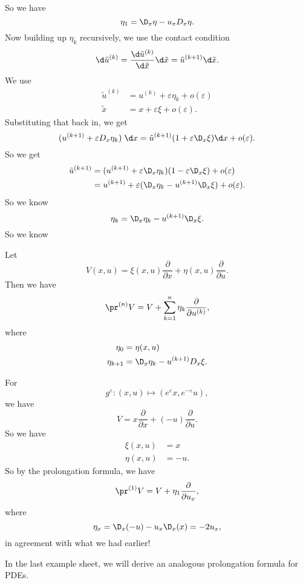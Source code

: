\documentclass[a4paper]{article}
\begin{document}
So we have
\[
  \eta_1 = \D_x \eta - u_x D_x \eta.
\]
Now building up $\eta_k$ recursively, we use the contact condition
\[
  \d \tilde{u}^{(k)} = \frac{\d \tilde{u}^{(k)}}{\d \tilde{x}}\d \tilde{x} = \tilde{u}^{(k + 1)} \d \tilde{x}.
\]
We use
\begin{align*}
  \tilde{u}^{(k)} &= u^{(k)} + \varepsilon \eta_k + o(\varepsilon)\\
  \tilde{x} &= x + \varepsilon \xi + o(\varepsilon).
\end{align*}
Substituting that back in, we get
\[
  (u^{(k + 1)} + \varepsilon D_x \eta_k) \;\d x = \tilde{u}^{(k + 1)} (1 + \varepsilon \D_x \xi) \d x + o(\varepsilon).
\]
So we get
\begin{align*}
  \tilde{u}^{(k + 1)} &= (u^{(k + 1)} + \varepsilon \D_x \eta_k) (1 - \varepsilon \D_x \xi) + o(\varepsilon)\\
  &= u^{(k + 1)} + \varepsilon(\D_x \eta_k - u^{(k + 1)} \D_x \xi) + o(\varepsilon).
\end{align*}
So we know
\[
  \eta_k = \D_x \eta_k - u^{(k + 1)} \D_x \xi.
\]
So we know
\begin{prop}
  Let
  \[
    V(x, u) = \xi(x, u) \frac{\partial}{\partial x} + \eta(x, u) \frac{\partial}{\partial u}.
  \]
  Then we have
  \[
    \pr^{(n)}V = V + \sum_{k = 1}^n \eta_k\frac{\partial}{\partial u^{(k)}},
  \]
  where
  \begin{align*}
    \eta_0 &= \eta(x, u)\\
    \eta_{k + 1} &= \D_x \eta_k - u^{(k + 1)} D_x \xi.
  \end{align*}
\end{prop}

\begin{eg}
  For
  \[
    g^\varepsilon: (x, u) \mapsto (e^\varepsilon x, e^{-\varepsilon}u),
  \]
  we have
  \[
    V = x \frac{\partial}{\partial x} + (-u) \frac{\partial}{\partial u}.
  \]
  So we have
  \begin{align*}
    \xi(x, u) &= x\\
    \eta(x, u) &= -u.
  \end{align*}
  So by the prolongation formula, we have
  \[
    \pr^{(1)}V = V + \eta_1 \frac{\partial}{\partial u_x},
  \]
  where
  \[
    \eta_x = \D_x (-u) - u_x \D_x(x) = -2 u_x,
  \]
  in agreement with what we had earlier!
\end{eg}

In the last example sheet, we will derive an analogous prolongation formula for PDEs.
\end{document}

